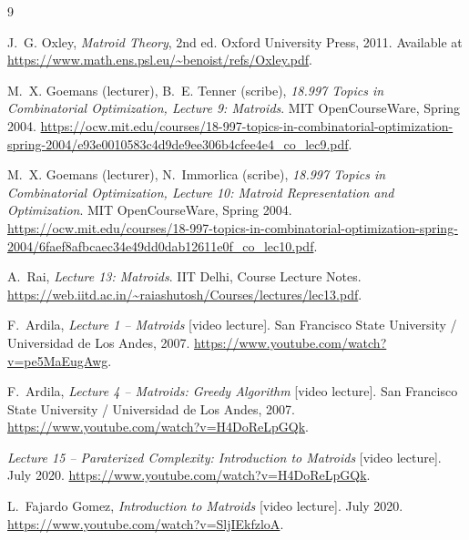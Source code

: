 \documentclass[11pt]{article}
\theoremstyle{plain}
\theoremstyle{definition}
\begin{document}
 
\begin{thebibliography}{9}
 
J.~G. Oxley,
\textit{Matroid Theory}, 2nd ed.
Oxford University Press, 2011.
Available at \url{https://www.math.ens.psl.eu/~benoist/refs/Oxley.pdf}.
 
M.~X. Goemans (lecturer), B.~E. Tenner (scribe),
\textit{18.997 Topics in Combinatorial Optimization, Lecture 9: Matroids}.
MIT OpenCourseWare, Spring 2004.
\url{https://ocw.mit.edu/courses/18-997-topics-in-combinatorial-optimization-spring-2004/e93e0010583c4d9de9ee306b4cfee4e4_co_lec9.pdf}.
 
M.~X. Goemans (lecturer), N.~Immorlica (scribe),
\textit{18.997 Topics in Combinatorial Optimization, Lecture 10: Matroid Representation and Optimization}.
MIT OpenCourseWare, Spring 2004.
\url{https://ocw.mit.edu/courses/18-997-topics-in-combinatorial-optimization-spring-2004/6faef8afbcaec34e49dd0dab12611e0f_co_lec10.pdf}.
 
A.~Rai,
\textit{Lecture 13: Matroids}.
IIT Delhi, Course Lecture Notes.
\url{https://web.iitd.ac.in/~raiashutosh/Courses/lectures/lec13.pdf}.
 
F.~Ardila,
\textit{Lecture 1 -- Matroids} [video lecture].
San Francisco State University / Universidad de Los Andes, 2007.
\url{https://www.youtube.com/watch?v=pe5MaEugAwg}.
 
F.~Ardila,
\textit{Lecture 4 -- Matroids: Greedy Algorithm} [video lecture].
San Francisco State University / Universidad de Los Andes, 2007.
\url{https://www.youtube.com/watch?v=H4DoReLpGQk}.
 
\textit{Lecture 15 -- Paraterized Complexity: Introduction to Matroids} [video lecture].
July 2020.
\url{https://www.youtube.com/watch?v=H4DoReLpGQk}.
 
L.~Fajardo Gomez,
\textit{Introduction to Matroids} [video lecture].
July 2020.
\url{https://www.youtube.com/watch?v=SljIEkfzloA}.
 
\end{thebibliography}
 
\end{document}
